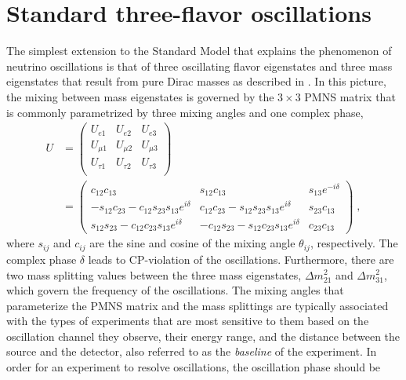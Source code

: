 \section{Standard three-flavor oscillations}
The simplest extension to the Standard Model that explains the phenomenon of neutrino oscillations is that of three oscillating flavor eigenstates and three mass eigenstates that result from pure Dirac masses as described in .
In this picture, the mixing between mass eigenstates is governed by the $3\times3$ PMNS matrix that is commonly parametrized by three mixing angles and one complex phase,
\begin{equation}
\begin{aligned}
    U &=
    \begin{pmatrix}
    U_{e1}    & U_{e2}    & U_{e3}    \\
    U_{\mu1}  & U_{\mu2}  & U_{\mu3}  \\
    U_{\tau1} & U_{\tau2} & U_{\tau3} \\
    \end{pmatrix} \\
    &=
    \begin{pmatrix}
        c_{12} c_{13} & s_{12} c_{13} & s_{13}e^{-i\delta}       \\
        -s_{12}c_{23} - c_{12}s_{23}s_{13}e^{i\delta} & c_{12}c_{23}-s_{12}s_{23}s_{13}e^{i\delta} & s_{23}c_{13} \\
        s_{12}s_{23}-c_{12}c_{23}s_{13}e^{i\delta} & -c_{12}s_{23}-s_{12}c_{23}s_{13}e^{i\delta} & c_{23}c_{13}
    \end{pmatrix}\;,
\end{aligned}\label{eq:pmns-parametrization}
\end{equation}
where $s_{ij}$ and $c_{ij}$ are the sine and cosine of the mixing angle $\theta_{ij}$, respectively.
The complex phase $\delta$ leads to CP-violation of the oscillations.
Furthermore, there are two mass splitting values between the three mass eigenstates, $\Delta m^2_{21}$ and $\Delta m^2_{31}$, which govern the frequency of the oscillations.
The mixing angles that parameterize the PMNS matrix and the mass splittings are typically associated with the types of experiments that are most sensitive to them based on the oscillation channel they observe, their energy range, and the distance between the source and the detector, also referred to as the \emph{baseline} of the experiment.
In order for an experiment to resolve oscillations, the oscillation phase should be
